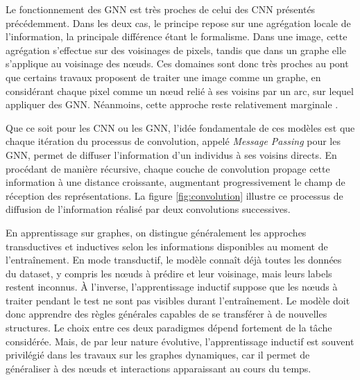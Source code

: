 \documentclass[a4paper,11pt,twoside]{StyleThese}
\begin{document}
Le fonctionnement des GNN est très proches de celui des CNN présentés précédemment. Dans les deux cas, le principe repose sur une agrégation locale de l’information, la principale différence étant le formalisme. Dans une image, cette agrégation s’effectue sur des voisinages de pixels, tandis que dans un graphe elle s’applique au voisinage des nœuds. Ces domaines sont donc très proches au pont que certains travaux proposent de traiter une image comme un graphe, en considérant chaque pixel comme un nœud relié à ses voisins par un arc, sur lequel appliquer des GNN. Néanmoins, cette approche reste relativement marginale \cite{gnn_image}. 

Que ce soit pour les CNN ou les GNN, l’idée fondamentale de ces modèles est que chaque itération du processus de convolution, appelé \textit{Message Passing} pour les GNN, permet de diffuser l’information d'un individus à ses voisins directs. En procédant de manière récursive, chaque couche de convolution propage cette information à une distance croissante, augmentant progressivement le champ de réception des représentations. La figure \ref{fig:convolution} illustre ce processus de diffusion de l’information réalisé par deux convolutions successives.

En apprentissage sur graphes, on distingue généralement les approches transductives et inductives selon les informations disponibles au moment de l’entraînement. En mode transductif, le modèle connaît déjà toutes les données du dataset, y compris les nœuds à prédire et leur voisinage, mais leurs labels restent inconnus. À l’inverse, l’apprentissage inductif suppose que les nœuds à traiter pendant le test ne sont pas visibles durant l’entraînement. Le modèle doit donc apprendre des règles générales capables de se transférer à de nouvelles structures. Le choix entre ces deux paradigmes dépend fortement de la tâche considérée. Mais, de par leur nature évolutive, l’apprentissage inductif est souvent privilégié dans les travaux sur les graphes dynamiques, car il permet de généraliser à des nœuds et interactions apparaissant au cours du temps. 


\end{document}

